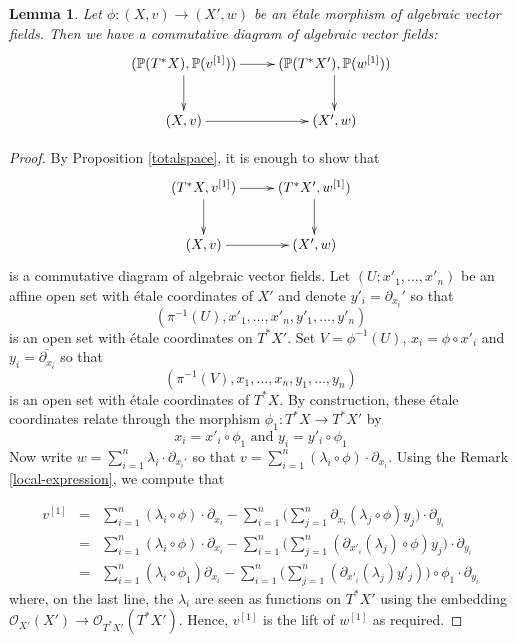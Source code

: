 \documentclass[12pt]{amsart}
\renewcommand{\P}{\mathbb{P}}
\theoremstyle{definition}
\theoremstyle{plain}
\newtheorem{lemma}[definition]{Lemma}
\theoremstyle{exampstyle}
\theoremstyle{exampstyle}\newtheorem{thmxbis}{Theorem}
\numberwithin{equation}{section}
\theoremstyle{remark}
\begin{document}
\begin{lemma}\label{lemma-prolongation}
Let $\phi: (X,v) \rightarrow (X',w)$ be an étale morphism of algebraic vector fields. Then we have a commutative diagram of algebraic vector fields: 
$$ \xymatrix{ (\P(T^\ast X),\P(v^{[1]})) \ar[d] \ar[r] & (\P(T^\ast X'),\P(w^{[1]})) \ar[d] \\ (X,v) \ar[r] & (X',w)}$$
\end{lemma}

\begin{proof} 
By Proposition \ref{totalspace}, it is enough to show that 
$$ \xymatrix{ (T^\ast X,v^{[1]}) \ar[d] \ar[r] & (T^\ast X',w^{[1]}) \ar[d] \\ (X,v) \ar[r] & (X',w)}$$
is a commutative diagram of algebraic vector fields. Let $(U;x'_1,\ldots, x'_n)$ be an affine open set with étale coordinates of $X'$ and denote $y'_i = \partial_{x_i}'$ so that
$$(\pi^{-1}(U), x'_1,\ldots, x'_n,y'_1,\ldots, y'_n)$$ is an open set with étale coordinates on $T^\ast X'$. Set $V = \phi^{-1}(U)$, $x_i = \phi \circ x'_i$ and $y_i = \overline{\partial_{x_i}}$ so that 
$$(\pi^{-1}(V), x_1,\ldots, x_n,y_1,\ldots, y_n)$$
is an open set with étale coordinates of $T^\ast X$.  By construction, these étale coordinates relate through the morphism $\phi_1: T^\ast X \rightarrow T^\ast X'$  by 
$$x_i = x'_i \circ \phi_1 \text{ and } y_i = y'_i \circ \phi_1 $$
Now write $w = \sum_{i = 1}^n \lambda_i \cdot \partial_{x_i'}$ so that
$v = \sum_{i = 1}^n (\lambda_i \circ \phi) \cdot \partial_{x_i}$.
Using the Remark \ref{local-expression}, we compute that

\begin{eqnarray*} 
v^{[1]} & = & \sum_{i = 1}^n (\lambda_i \circ \phi) \cdot \partial_{x_i} - \sum_{i = 1}^n \Big( \sum_{j = 1}^n \partial_{x_i}(\lambda_j \circ \phi)y_j \Big) \cdot \partial_{y_i} \\ 
& = & \sum_{i = 1}^n (\lambda_i \circ \phi) \cdot \partial_{x_i} - \sum_{i = 1}^n \Big( \sum_{j = 1}^n (\partial_{x'_i}(\lambda_j) \circ \phi) y_j \Big) \cdot \partial_{y_i} \\
 & = & \sum_{i = 1}^n (\lambda_i \circ \phi_1) \partial_{x_i} - \sum_{i = 1}^n \Big( \sum_{j = 1}^n (\partial_{x'_i}(\lambda_j)y'_j)  \Big) \circ \phi_1 \cdot \partial_{y_i}
\end{eqnarray*}
where, on the last line, the $\lambda_i$ are seen as functions on $T^\ast X'$ using the embedding $\mathcal O_{X'}(X') \rightarrow \mathcal O_{T^\ast X'} (T^\ast X')$. Hence, $v^{[1]}$ is the lift of $w^{[1]}$ as required.
\end{proof} 
\end{document}
